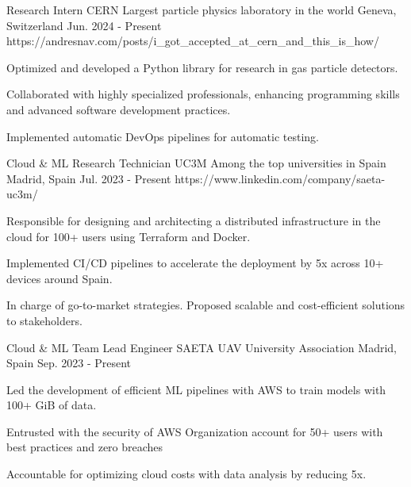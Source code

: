 
\begin{cventries}
	\cventry%
	{Research Intern} %
	{CERN} %
	{Largest particle physics laboratory in the world}
	{Geneva, Switzerland} %
	{Jun. 2024 - Present} %
	{https://andresnav.com/posts/i_got_accepted_at_cern_and_this_is_how/} %
	{
		\begin{cvitems} %
			\item {Optimized and developed a Python library for research in gas particle detectors.}
			\item {Collaborated with highly specialized professionals, enhancing programming skills and advanced software development practices.}
			\item {Implemented automatic DevOps pipelines for automatic testing.}
		\end{cvitems}
	}

	\cventry%
	{Cloud \& ML Research Technician} %
	{UC3M} %
	{Among the top universities in Spain}
	{Madrid, Spain} %
	{Jul. 2023 - Present} %
	{https://www.linkedin.com/company/saeta-uc3m/} %
	{
		\begin{cvitems} %
			\item {Responsible for designing and architecting a distributed infrastructure in the cloud for 100+ users using Terraform and Docker.}
			\item {Implemented CI/CD pipelines to accelerate the deployment by 5x across 10+ devices around Spain.}
			\item {In charge of go-to-market strategies. Proposed scalable and cost-efficient solutions to stakeholders.}
		\end{cvitems}
	}

	\cventry%
	{Cloud \& ML Team Lead Engineer} %
	{SAETA} %
	{UAV University Association}
	{Madrid, Spain} %
	{Sep. 2023 - Present} %
	{} %
	{
		\begin{cvitems} %
			\item {Led the development of efficient ML pipelines with AWS to train models with 100+ GiB of data.}
			\item {Entrusted with the security of AWS Organization account for 50+ users with best practices and zero breaches}
			\item {Accountable for optimizing cloud costs with data analysis by reducing 5x.}
		\end{cvitems}
	}


\end{cventries}
